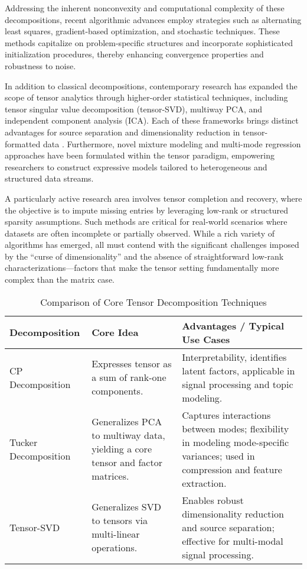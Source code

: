 \documentclass[sigconf]{acmart}
\begin{document}
Addressing the inherent nonconvexity and computational complexity of these decompositions, recent algorithmic advances employ strategies such as alternating least squares, gradient-based optimization, and stochastic techniques. These methods capitalize on problem-specific structures and incorporate sophisticated initialization procedures, thereby enhancing convergence properties and robustness to noise.

In addition to classical decompositions, contemporary research has expanded the scope of tensor analytics through higher-order statistical techniques, including tensor singular value decomposition (tensor-SVD), multiway PCA, and independent component analysis (ICA). Each of these frameworks brings distinct advantages for source separation and dimensionality reduction in tensor-formatted data \cite{ref104}. Furthermore, novel mixture modeling and multi-mode regression approaches have been formulated within the tensor paradigm, empowering researchers to construct expressive models tailored to heterogeneous and structured data streams.

A particularly active research area involves tensor completion and recovery, where the objective is to impute missing entries by leveraging low-rank or structured sparsity assumptions. Such methods are critical for real-world scenarios where datasets are often incomplete or partially observed. While a rich variety of algorithms has emerged, all must contend with the significant challenges imposed by the ``curse of dimensionality'' and the absence of straightforward low-rank characterizations---factors that make the tensor setting fundamentally more complex than the matrix case.

\begin{table*}[htbp]
\centering
\caption{Comparison of Core Tensor Decomposition Techniques}
\label{tab:tensor_decomp_comparison}
\begin{adjustbox}{max width=\textwidth}
\begin{tabular}{lll}
\toprule
\textbf{Decomposition} & \textbf{Core Idea} & \textbf{Advantages / Typical Use Cases} \\
\midrule
CP Decomposition & Expresses tensor as a sum of rank-one components. & Interpretability, identifies latent factors, applicable in signal processing and topic modeling. \\
Tucker Decomposition & Generalizes PCA to multiway data, yielding a core tensor and factor matrices. & Captures interactions between modes; flexibility in modeling mode-specific variances; used in compression and feature extraction. \\
Tensor-SVD & Generalizes SVD to tensors via multi-linear operations. & Enables robust dimensionality reduction and source separation; effective for multi-modal signal processing. \\
\bottomrule
\end{tabular}
\end{adjustbox}
\end{table*}
\end{document}
